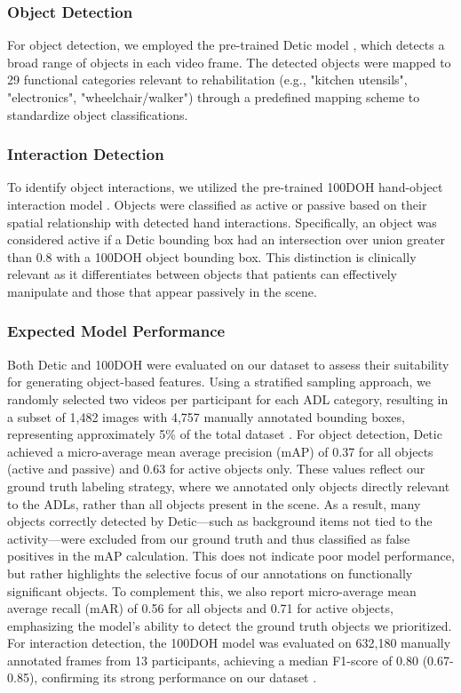 \documentclass[journal,twoside,web]{ieeecolor}
\begin{document}
\subsubsection{Object Detection}

For object detection, we employed the pre-trained Detic model \cite{Zhou2022-fl}, which detects a broad range of objects in each video frame. The detected objects were mapped to 29 functional categories relevant to rehabilitation (e.g., "kitchen utensils", "electronics", "wheelchair/walker") through a predefined mapping scheme to standardize object classifications.

\subsubsection{Interaction Detection}

To identify object interactions, we utilized the pre-trained 100DOH hand-object interaction model \cite{Shan2020-gh}. Objects were classified as active or passive based on their spatial relationship with detected hand interactions. Specifically, an object was considered active if a Detic bounding box had an intersection over union greater than 0.8 with a 100DOH object bounding box. This distinction is clinically relevant as it differentiates between objects that patients can effectively manipulate and those that appear passively in the scene.

\subsubsection{Expected Model Performance}

Both Detic \cite{Zhou2022-fl} and 100DOH \cite{Shan2020-gh} were evaluated on our dataset to assess their suitability for generating object-based features. Using a stratified sampling approach, we randomly selected two videos per participant for each ADL category, resulting in a subset of 1,482 images with 4,757 manually annotated bounding boxes, representing approximately 5\% of the total dataset \cite{Kadambi2023-hx}. For object detection, Detic achieved a micro-average mean average precision (mAP) of 0.37 for all objects (active and passive) and 0.63 for active objects only. These values reflect our ground truth labeling strategy, where we annotated only objects directly relevant to the ADLs, rather than all objects present in the scene. As a result, many objects correctly detected by Detic—such as background items not tied to the activity—were excluded from our ground truth and thus classified as false positives in the mAP calculation. This does not indicate poor model performance, but rather highlights the selective focus of our annotations on functionally significant objects. To complement this, we also report micro-average mean average recall (mAR) of 0.56 for all objects and 0.71 for active objects, emphasizing the model's ability to detect the ground truth objects we prioritized. For interaction detection, the 100DOH model \cite{Shan2020-gh} was evaluated on 632,180 manually annotated frames from 13 participants, achieving a median F1-score of 0.80 (0.67-0.85), confirming its strong performance on our dataset \cite{Bandini2022-rs}.
\end{document}
